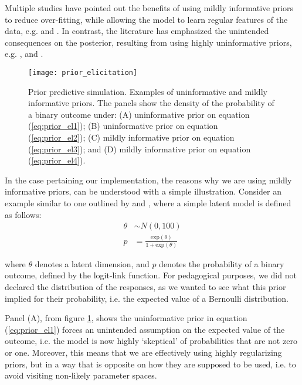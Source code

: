Multiple studies have pointed out the benefits of using mildly informative priors to reduce over-fitting, while allowing the model to learn regular features of the data, e.g. \citet{McElreath_2020, Gelman_et_al_1996b} and \citet{Jaynes_1985}. In contrast, the literature has emphasized the unintended consequences on the posterior, resulting from using highly uninformative priors, e.g. \citet{Seaman_et_al_2012}, and \citet{Gelman_1996}. 
%
\begin{figure}[!h]
	\centering
	\texttt{[image: prior\_elicitation]}
	\caption[Prior predictive simulation. Examples of uninformative and mildly informative priors.]%
	{Prior predictive simulation. Examples of uninformative and mildly informative priors. The panels show the density of the probability of a binary outcome under: (A) uninformative prior on equation (\ref{eq:prior_el1}); (B) uninformative prior on equation (\ref{eq:prior_el2}); (C) mildly informative prior on equation (\ref{eq:prior_el3}); and (D) mildly informative prior on equation (\ref{eq:prior_el4}).}
	\label{fig:prior_elicitation}
\end{figure}

In the case pertaining our implementation, the reasons why we are using mildly informative priors, can be understood with a simple illustration. Consider an example similar to one outlined by \citet{Seaman_et_al_2012} and \citet{McElreath_2020}, where a simple latent model is defined as follows:
%
\begin{equation} \label{eq:prior_el1}
	\begin{split}	
		\theta &\sim N(0, 100) \\
		p &= \frac{ \text{exp}(\theta) }{ 1 + \text{exp}(\theta) }
	\end{split}
\end{equation}

\noindent where $\theta$ denotes a latent dimension, and $p$ denotes the probability of a binary outcome, defined by the logit-link function. For pedagogical purposes, we did not declared the distribution of the responses, as we wanted to see what this prior implied for their probability, i.e. the expected value of a Bernoulli distribution.

Panel (A), from figure \ref{fig:prior_elicitation}, shows the uninformative prior in equation (\ref{eq:prior_el1}) forces an unintended assumption on the expected value of the outcome, i.e. the model is now highly `skeptical' of probabilities that are not zero or one. Moreover, this means that we are effectively using highly regularizing priors, but in a way that is opposite on how they are supposed to be used, i.e. to avoid visiting non-likely parameter spaces.

